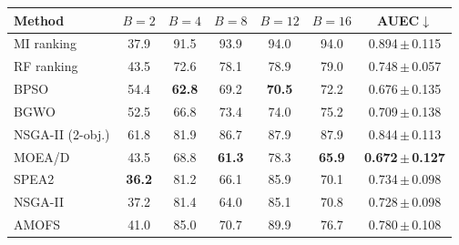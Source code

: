 \begin{tabular}{lcccccc}
\toprule
Method & $B=2$ & $B=4$ & $B=8$ & $B=12$ & $B=16$ & AUEC$\downarrow$ \\
\midrule
MI ranking & 37.9 & 91.5 & 93.9 & 94.0 & 94.0 & 0.894\,$\pm$\,0.115 \\
RF ranking & 43.5 & 72.6 & 78.1 & 78.9 & 79.0 & 0.748\,$\pm$\,0.057 \\
BPSO & 54.4 & \textbf{62.8} & 69.2 & \textbf{70.5} & 72.2 & 0.676\,$\pm$\,0.135 \\
BGWO & 52.5 & 66.8 & 73.4 & 74.0 & 75.2 & 0.709\,$\pm$\,0.138 \\
NSGA-II (2-obj.) & 61.8 & 81.9 & 86.7 & 87.9 & 87.9 & 0.844\,$\pm$\,0.113 \\
MOEA/D & 43.5 & 68.8 & \textbf{61.3} & 78.3 & \textbf{65.9} & \textbf{0.672\,$\pm$\,0.127} \\
SPEA2 & \textbf{36.2} & 81.2 & 66.1 & 85.9 & 70.1 & 0.734\,$\pm$\,0.098 \\
NSGA-II & 37.2 & 81.4 & 64.0 & 85.1 & 70.8 & 0.728\,$\pm$\,0.098 \\
AMOFS & 41.0 & 85.0 & 70.7 & 89.9 & 76.7 & 0.780\,$\pm$\,0.108 \\
\bottomrule
\end{tabular}
